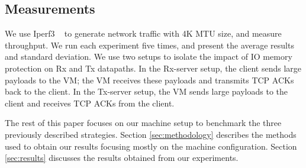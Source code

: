\subsection{Measurements}
\label{subsec:measurements}
We use Iperf3 ~\cite{iperf3} to generate network traffic with 4K MTU size, and measure throughput. We run each experiment five times, and present the average results and standard deviation. We use two setups to isolate the impact of IO memory protection on Rx and Tx datapaths. In the Rx-server setup, the client sends large payloads to the VM; the VM receives these payloads and transmits TCP ACKs back to the client. In the Tx-server setup, the VM sends large payloads to the client and receives TCP ACKs from the client.

The rest of this paper focuses on our machine setup to benchmark the three previously described strategies. Section \ref{sec:methodology} describes the methods used to obtain our results focusing mostly on the machine configuration. Section \ref{sec:results} discusses the results obtained from our experiments. 


